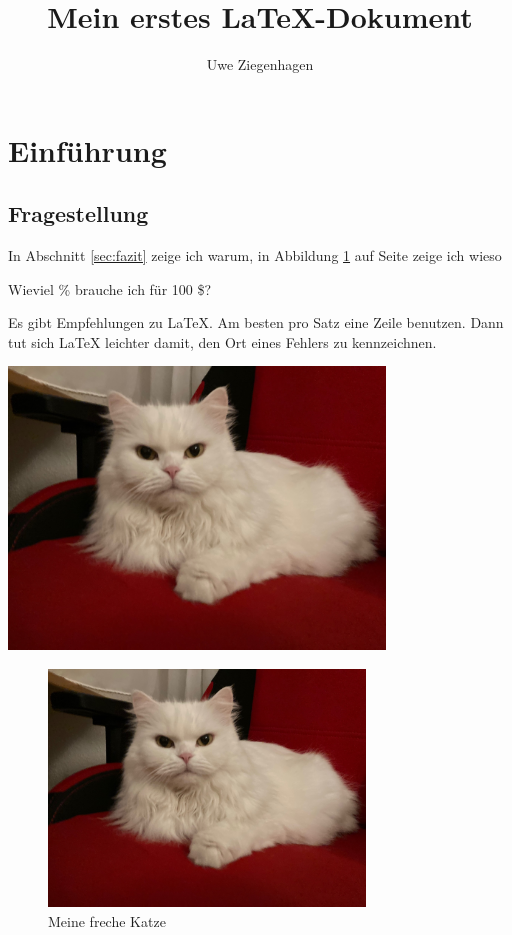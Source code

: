 \documentclass[12pt,parskip=half]{scrartcl}
\author{Uwe Ziegenhagen}
\title{Mein erstes \LaTeX-Dokument}
\begin{document}
\maketitle

\tableofcontents %

\listoffigures

\listoftables

\listoftodos

\clearpage

\section{Einführung}
\subsection{Fragestellung} 

In Abschnitt \ref{sec:fazit} zeige ich warum, in Abbildung \ref{fig:katze} auf Seite \pageref{fig:katze} zeige ich wieso

Wieviel \% brauche ich für 100 \$? %

Es gibt Empfehlungen zu LaTeX.
Am besten pro Satz eine Zeile benutzen.
Dann tut sich LaTeX leichter damit, den Ort eines Fehlers zu kennzeichnen.

\includegraphics[width=0.75\textwidth]{Bilder/Katze}


\begin{figure}
\centering
\includegraphics[width=0.75\textwidth]{Bilder/Katze}
\caption{Meine freche Katze}\label{fig:katze}
\end{figure}
\end{document}
